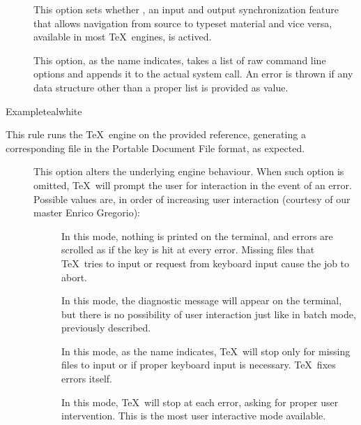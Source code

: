 \begin{description}
\begin{description}
\item[] This option sets whether , an input and output synchronization feature that allows navigation from source to typeset material and vice versa, available in most \TeX\ engines, is actived.

\item[] This option, as the name indicates, takes a list of raw command line options and appends it to the actual system call. An error is thrown if any data structure other than a proper list is provided as value.
\end{description}

\begin{codebox}{Example}{teal}{\icnote}{white}
\end{codebox}

\item[\rulebox{xetex}{Marco Daniel, Paulo Cereda}] This rule runs the  \TeX\ engine on the provided  reference, generating a corresponding file in the Portable Document File format, as expected.

\begin{description}
\item[] This option alters the underlying engine behaviour. When such option is omitted, \TeX\ will prompt the user for interaction in the event of an error. Possible values are, in order of increasing user interaction (courtesy of our master Enrico Gregorio):

\begin{description}
\item[] In this mode, nothing is printed on the terminal, and errors are scrolled as if the  key is hit at every error. Missing files that \TeX\ tries to input or request from keyboard input cause the job to abort.

\item[] In this mode, the diagnostic message will appear on the terminal, but there is no possibility of user interaction just like in batch mode, previously described.

\item[] In this mode, as the name indicates, \TeX\ will stop only for missing files to input or if proper keyboard input is necessary. \TeX\ fixes errors itself.

\item[] In this mode, \TeX\ will stop at each error, asking for proper user intervention. This is the most user interactive mode available.
\end{description}


\end{description}
\end{description}
